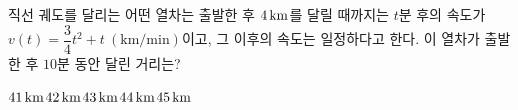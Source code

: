 직선 궤도를 달리는 어떤 열차는 출발한 후 $4\mkern3mu \mathrm{km}$를 달릴 때까지는 $t$분 후의 속도가 $v(t)=\dfrac{3}{4}t^2+t\ (\mathrm{km/min})$이고, 그 이후의 속도는 일정하다고 한다. 이 열차가 출발한 후 $10$분 동안 달린 거리는?
\begin{choices32}{$41\mkern3mu \mathrm{km}$}{$42\mkern3mu \mathrm{km}$}{$43\mkern3mu \mathrm{km}$}{$44\mkern3mu \mathrm{km}$}{$45\mkern3mu \mathrm{km}$}\end{choices32}
